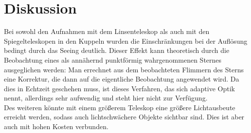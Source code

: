 \section{Diskussion}
Bei sowohl den Aufnahmen mit dem Linsenteleskop als auch mit den Spiegelteleskopen in den Kuppeln wurden die Einschränkungen bei der Auflösung bedingt durch das Seeing deutlich. Dieser Effekt kann theoretisch durch die Beobachtung eines als annähernd punktförmig wahrgenommenen Sternes ausgeglichen werden: Man errechnet aus dem beobachteten Flimmern des Sterns eine Korrektur, die dann auf die eigentliche Beobachtung angewendet wird. Da dies in Echtzeit geschehen muss, ist dieses Verfahren, das sich adaptive Optik nennt, allerdings sehr aufwendig und steht hier nicht zur Verfügung. \\
Des weiteren könnte mit einem größerem Teleskop eine größere Lichtausbeute erreicht werden, sodass auch lichtschwächere Objekte sichtbar sind. Dies ist aber auch mit hohen Kosten verbunden. 


